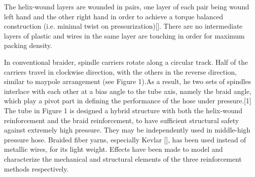 The helix-wound layers are wounded in pairs, one layer of each pair being wound left hand and the other right hand in order to achieve a torque balanced construction (i.e. minimal twist on pressurization)[]. There are no intermediate layers of plastic and wires in the same layer are touching in order for maximum packing density.



In conventional braider, spindle carriers rotate along a circular track. Half of the carriers travel in clockwise direction, with the others in the reverse direction, similar to maypole arrangement (see Figure 1).As a result, he two sets of spindles interlace with each other at a bias angle to the tube axis, namely the braid angle, which play a pivot part in defining the performance of the hose under pressure.[1]
The tube in Figure 1 is designed a hybrid structure with both the helix-wound reinforcement and the braid reinforcement, to have sufficient structural safety against extremely high pressure. They may be independently used in middle-high pressure hose. Braided fiber yarns, especially Kevlar [], has been used instead of metallic wires, for its light weight. Effects have been made to model and characterize the mechanical and structural elements of the three reinforcement methods respectively.



